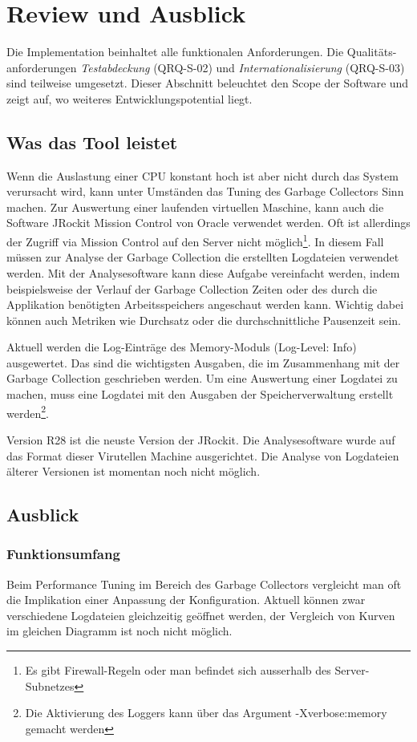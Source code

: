 \chapter{Review und Ausblick}\label{review}
Die Implementation beinhaltet alle funktionalen Anforderungen. Die Qualitäts-anforderungen \textit{Testabdeckung} (QRQ-S-02) und \textit{Internationalisierung} (QRQ-S-03) sind teilweise umgesetzt. Dieser Abschnitt beleuchtet den Scope der Software und zeigt auf, wo weiteres Entwicklungspotential liegt.

\section{Was das Tool leistet}
Wenn die Auslastung einer CPU konstant hoch ist aber nicht durch das System verursacht wird, kann unter Umständen das Tuning des Garbage Collectors Sinn machen. 
Zur Auswertung einer laufenden virtuellen Maschine, kann auch die Software JRockit Mission Control von Oracle verwendet werden. Oft ist allerdings der Zugriff via Mission Control auf den Server nicht möglich\footnote{Es gibt Firewall-Regeln oder man befindet sich ausserhalb des Server-Subnetzes}. In diesem Fall müssen zur Analyse der Garbage Collection die erstellten Logdateien verwendet werden. Mit der Analysesoftware kann diese Aufgabe vereinfacht werden, indem beispielsweise der Verlauf der Garbage Collection Zeiten oder des durch die Applikation benötigten Arbeitsspeichers angeschaut werden kann. Wichtig dabei können auch Metriken wie Durchsatz oder die durchschnittliche Pausenzeit sein.

Aktuell werden die Log-Einträge des Memory-Moduls  (Log-Level: Info) ausgewertet. Das sind die wichtigsten Ausgaben, die im Zusammenhang mit der Garbage Collection geschrieben werden. Um eine Auswertung einer Logdatei zu machen, muss eine Logdatei mit den Ausgaben der Speicherverwaltung erstellt werden\footnote{Die Aktivierung des Loggers kann über das Argument -Xverbose:memory gemacht werden}.

Version R28 ist die neuste Version der JRockit. Die Analysesoftware wurde auf das Format dieser Virutellen Machine ausgerichtet. Die Analyse von Logdateien älterer Versionen ist momentan noch nicht möglich.

\section{Ausblick}
\subsection{Funktionsumfang}
Beim Performance Tuning im Bereich des Garbage Collectors vergleicht man oft die Implikation einer Anpassung der Konfiguration. Aktuell können zwar verschiedene Logdateien gleichzeitig geöffnet werden, der Vergleich von Kurven im gleichen Diagramm ist noch nicht möglich.

